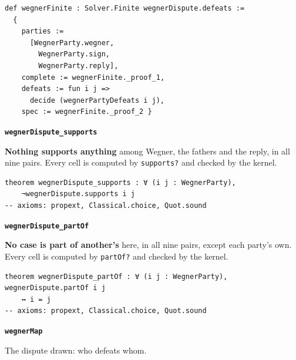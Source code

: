 \documentclass[11pt]{article}
\begin{document}
{\small\begin{verbatim}
def wegnerFinite : Solver.Finite wegnerDispute.defeats :=
  {
    parties :=
      [WegnerParty.wegner,
        WegnerParty.sign,
        WegnerParty.reply],
    complete := wegnerFinite._proof_1,
    defeats := fun i j =>
      decide (wegnerPartyDefeats i j),
    spec := wegnerFinite._proof_2 }
\end{verbatim}}
\par\medskip\noindent\textbf{\texttt{wegner\allowbreak{}Dispute\_\allowbreak{}supports}}\par\nobreak\noindent
\textbf{Nothing supports anything} among Wegner, the fathers and the reply, in all nine pairs. Every cell is computed by \texttt{supports?} and checked by the kernel.

{\small\begin{verbatim}
theorem wegnerDispute_supports : ∀ (i j : WegnerParty),
    ¬wegnerDispute.supports i j
-- axioms: propext, Classical.choice, Quot.sound
\end{verbatim}}
\par\medskip\noindent\textbf{\texttt{wegner\allowbreak{}Dispute\_\allowbreak{}part\allowbreak{}Of}}\par\nobreak\noindent
\textbf{No case is part of another's} here, in all nine pairs, except each party's own. Every cell is computed by \texttt{part\allowbreak{}Of?} and checked by the kernel.

{\small\begin{verbatim}
theorem wegnerDispute_partOf : ∀ (i j : WegnerParty), wegnerDispute.partOf i j
    ↔ i = j
-- axioms: propext, Classical.choice, Quot.sound
\end{verbatim}}
\par\medskip\noindent\textbf{\texttt{wegner\allowbreak{}Map}}\par\nobreak\noindent
The dispute drawn: who defeats whom.
\end{document}
